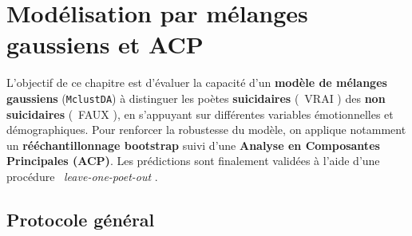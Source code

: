 \section{Modélisation par mélanges gaussiens et ACP}
\label{sec:mgaussiens-pca}

L’objectif de ce chapitre est d’évaluer la capacité d’un \textbf{modèle de mélanges gaussiens} (\texttt{MclustDA}) à distinguer les poètes \textbf{suicidaires} (\og\, VRAI \fg) des \textbf{non suicidaires} (\og\, FAUX \fg), en s’appuyant sur différentes variables émotionnelles et démographiques. Pour renforcer la robustesse du modèle, on applique notamment un \textbf{rééchantillonnage bootstrap} suivi d’une \textbf{Analyse en Composantes Principales (ACP)}. Les prédictions sont finalement validées à l’aide d’une procédure \og\, \emph{leave-one-poet-out} \fg.

\subsection{Protocole général}


